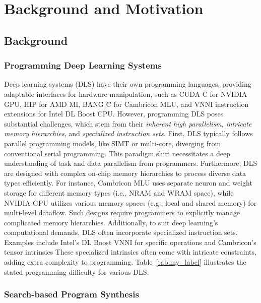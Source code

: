 
\vspace{-10pt}
\section{Background and Motivation}
\vspace{-5pt}
\subsection{Background}
\subsubsection{Programming Deep Learning Systems}


Deep learning systems (DLS) have their own programming languages, providing adaptable interfaces for hardware manipulation, such as CUDA C for NVIDIA GPU, HIP for AMD MI, BANG C for Cambricon MLU, and VNNI instruction extensions for Intel DL Boost CPU.
However, programming DLS poses substantial challenges, which stem from their \emph{inherent high parallelism}, \emph{intricate memory hierarchies}, and \emph{specialized instruction sets}. 
First, DLS typically follows parallel programming models, like SIMT or multi-core, diverging from conventional serial programming. This paradigm shift necessitates a deep understanding of task and data parallelism from programmers.
Furthermore, DLS are designed with complex on-chip memory hierarchies to process diverse data types efficiently. For instance, Cambricon MLU uses separate neuron and weight storage for different memory types (i.e., NRAM and WRAM space), while NVIDIA GPU utilizes various memory spaces (e.g., local and shared memory) for multi-level dataflow. Such designs require programmers to explicitly manage complicated memory hierarchies.
Additionally, to suit deep learning's computational demands, DLS often incorporate specialized instruction sets. Examples include Intel's DL Boost VNNI for specific operations and Cambricon's tensor intrinsics %
These specialized intrinsics often come with intricate constraints, adding extra complexity to programming. 
Table~\ref{tab:my_label} illustrates the stated programming difficulty for various DLS.



\subsubsection{Search-based Program Synthesis}

